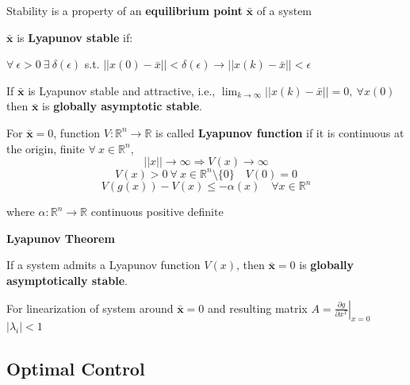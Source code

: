 Stability is a property of an
\textbf{equilibrium point} $\bar{\mathbf{x}}$
of a system

\begin{definition}
	$\bar{\mathbf{x}}$ is \textbf{Lyapunov stable} if:

	$\forall\ \epsilon>0\ \exists\ \delta(\epsilon)$ s.t.
	$\lvert\lvert x(0) - \bar{x} \rvert\rvert < \delta(\epsilon) \to
		\lvert\lvert x(k) - \bar{x} \rvert\rvert < \epsilon$
\end{definition}

\begin{definition}
	If $\bar{\mathbf{x}}$ is Lyapunov stable and attractive, i.e.,
	$\lim_{k\to\infty} ||x(k)-\bar{x}||=0,\ \forall x(0)$
	then $\bar{\mathbf{x}}$ is \textbf{globally asymptotic stable}.
\end{definition}

\begin{sstFrame}[RoyalBlue!50]
	\begin{definition}
		For  $\bar{\mathbf{x}}=0$,
		function $V:\mathbb{R}^n\to \mathbb{R}$ is called
		\textbf{Lyapunov function} if it is continuous at the origin,
		finite $\forall\ x\in \mathbb{R}^{n}$,
		\[
			||x||\to\infty\Rightarrow V(x)\to\infty
		\]
		\[
			V(x)>0\ \forall\ x\in\mathbb{R}^n \setminus\{0\}\quad V(0)=0
		\]
		\[
			V(g(x)) - V(x) \leq -\alpha(x) \quad \forall x \in \mathbb{R}^n
		\]

		where $\alpha:\mathbb{R}^n\to \mathbb{R}$
		continuous positive definite
	\end{definition}
\end{sstFrame}

\begin{sstTitleBox}[Plum]{\center\textbf{\large
			Lyapunov Theorem
		}}
	\begin{theorem}
		If a system admits a Lyapunov function $V(x)$,
		then $\bar{\mathbf{x}} = 0$ is
		\textbf{globally asymptotically stable}.
	\end{theorem}
	\begin{theorem}
		For linearization of system around $\bar{\mathbf{x}}=0$
		and resulting matrix
		$A=\left.\frac{\partial g}{\partial x^T}\right|_{x=0}$
		$|\lambda_i|<1$ %
	\end{theorem}
\end{sstTitleBox}
\subsection{Optimal Control}

